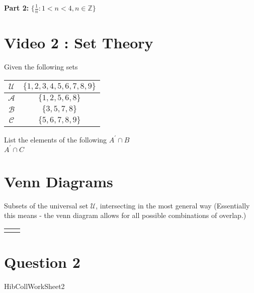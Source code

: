 \documentclass[]{report}
\begin{document}
\Large
\vspace{-4cm}
\textbf{Part 2:} $ \{ \frac{1}{n}: 1 < n < 4, n \in \mathbb{Z} \} $


\section{Video 2 : Set Theory}

\Large
Given the following sets

\begin{center}
	\begin{tabular}{|c|c|} \hline
		$\mathcal{U}$ & $\{1,2,3,4,5,6,7,8,9\}$ \\ \hline
		$\mathcal{A}$ & $\{1,2,5,6,8\}$ \\ \hline
		$\mathcal{B}$ & $\{3,5,7,8\}$ \\ \hline
		$\mathcal{C}$ & $\{5,6,7,8,9\}$ \\ \hline
	\end{tabular}
\end{center}

List the elements of the following
$A^{\prime} \cap B $\\
$A^{\prime} \cap C $\\


\section*{Venn Diagrams}

Subsets of the universal set $\mathcal{U}$, intersecting in the most general way (Essentially this means - the venn diagram allows for all possible combinations of overlap.)

\begin{center}
	\begin{tabular}{|c|c|}
		\hline  &  \\ 
		\hline  &  \\ 
		\hline 
	\end{tabular} 
\end{center}


	\section*{Question 2}
	HibCollWorkSheet2
	
\end{document}
